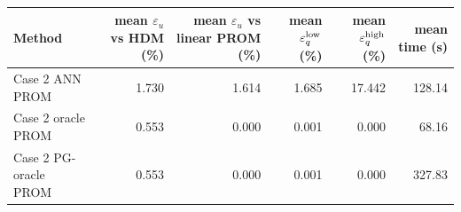 \begin{tabular}{lrrrrr}
\toprule
Method & mean $\varepsilon_u$ vs HDM (\%) & mean $\varepsilon_u$ vs linear PROM (\%) & mean $\varepsilon_q^{\rm low}$ (\%) & mean $\varepsilon_q^{\rm high}$ (\%) & mean time (s) \\
\midrule
Case 2 ANN PROM & 1.730 & 1.614 & 1.685 & 17.442 & 128.14 \\
Case 2 oracle PROM & 0.553 & 0.000 & 0.001 & 0.000 & 68.16 \\
Case 2 PG-oracle PROM & 0.553 & 0.000 & 0.001 & 0.000 & 327.83 \\
\bottomrule
\end{tabular}
